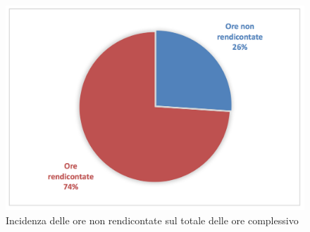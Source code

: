 			\begin{figure}[H]
			\centering
			\includegraphics[scale=0.40]{img/incidenza}
			\caption{Incidenza delle ore non rendicontate sul totale delle ore complessivo}
			\label{fig:incidenza}
			\end{figure}
			\newpage
